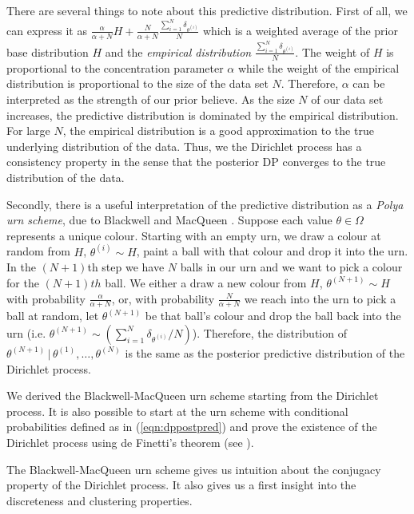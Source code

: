 \documentclass[final,3p,times,twocolumn]{elsarticle}
\begin{document}
There are several things to note about this predictive distribution.
First of all, we can express it as $\frac{\alpha}{\alpha+N}H + \frac{N}{\alpha+N}\frac{\sum_{i=1}^N \delta_{\theta^{(i)}}}{N}$ which is a weighted average of the prior base distribution $H$ and the \emph{empirical distribution} $\frac{\sum_{i=1}^N \delta_{\theta^{(i)}}}{N}$.
The weight of $H$ is proportional to the concentration parameter $\alpha$ while the weight of the empirical distribution is proportional to the size of the data set $N$.
Therefore, $\alpha$ can be interpreted as the strength of our prior believe.
As the size $N$ of our data set increases, the predictive distribution is dominated by the empirical distribution.
For large $N$, the empirical distribution is a good approximation to the true underlying distribution of the data. 
Thus, we the Dirichlet process has a consistency property in the sense that the posterior DP converges to the true distribution of the data.

Secondly, there is a useful interpretation of the predictive distribution as a \emph{Polya urn scheme}, due to Blackwell and MacQueen \cite{blackwell1973}.
Suppose each value $\theta \in \Omega$ represents a unique colour.
Starting with an empty urn, we draw a colour at random from $H$, $\theta^{(i)} \sim H$, paint a ball with that colour and drop it into the urn.
In the $(N+1)$th step we have $N$ balls in our urn and we want to pick a colour for the $(N+1)th$ ball.
We either a draw a new colour from $H$, $\theta^{(N+1)} \sim H$ with probability $\frac{\alpha}{\alpha+N}$, or, with probability $\frac{N}{\alpha+N}$ we reach into the urn to pick a ball at random, let $\theta^{(N+1)}$ be that ball's colour and drop the ball back into the urn (i.e. $\theta^{(N+1)}\sim (\sum_{i=1}^N \delta_{\theta^{(i)}}/N)$). 
Therefore, the distribution of $\theta^{(N+1)} \,|\,\theta^{(1)},\dots,\theta^{(N)}$ is the same as the posterior predictive distribution of the Dirichlet process.

We derived the Blackwell-MacQueen urn scheme starting from the Dirichlet process. 
It is also possible to start at the urn scheme with conditional probabilities defined as in (\ref{eqn:dppostpred}) and prove the existence of the Dirichlet process using de Finetti's theorem (see \cite{blackwell1973}).

The Blackwell-MacQueen urn scheme gives us intuition about the conjugacy property of the Dirichlet process.
It also gives us a first insight into the discreteness and clustering properties.
\end{document}
